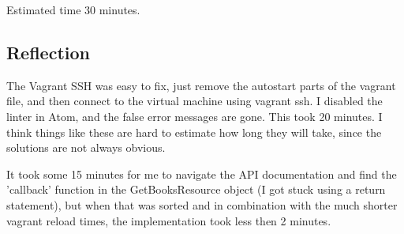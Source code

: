 \documentclass[fleqn,a4paper,11pt]{article}
\begin{document}
Estimated time 30 minutes.

\subsection{Reflection}
The Vagrant SSH was easy to fix, just remove the autostart parts of the vagrant file, and then connect to the virtual machine using vagrant ssh. I disabled the linter in Atom, and the false error messages are gone. This took 20 minutes. I think things like these are hard to estimate how long they will take, since the solutions are not always obvious. 

It took some 15 minutes for me to navigate the API documentation and find the 'callback' function in the GetBooksResource object (I got stuck using a return statement), but when that was sorted and in combination with the much shorter vagrant reload times, the implementation took less then 2 minutes.
\end{document}
